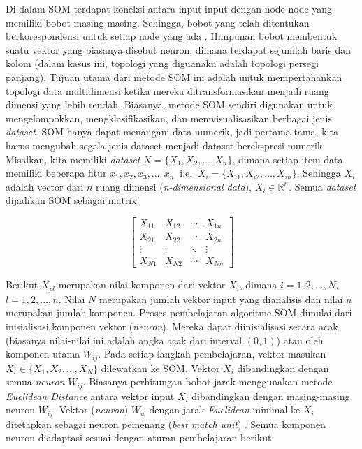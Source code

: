 Di dalam SOM terdapat koneksi antara input-input dengan node-node yang memiliki bobot masing-masing. Sehingga, bobot yang telah ditentukan berkorespondensi untuk setiap node yang ada \citep{StefanovicKurasova2014a}. Himpunan bobot membentuk suatu vektor yang biasanya disebut neuron, dimana terdapat sejumlah baris dan kolom (dalam kasus ini, topologi yang diguanakn adalah topologi persegi panjang). Tujuan utama dari metode SOM ini adalah untuk mempertahankan topologi data multidimensi ketika mereka ditransformasikan menjadi ruang dimensi yang lebih rendah. Biasanya, metode SOM sendiri digunakan untuk mengelompokkan, mengklasifikasikan, dan memvisualisasikan berbagai jenis \textit{dataset}. SOM hanya dapat menangani data numerik, jadi pertama-tama, kita harus mengubah segala jenis dataset menjadi dataset     berekspresi     numerik.     Misalkan,     kita     memiliki    \textit{dataset} $X = \{ X_1, X_2, \ldots, X_n \}$, dimana     setiap     item     data     memiliki     beberapa     fitur $x_1, x_2, x_3, \ldots, x_n \ $ i.e. $\ X_i = \{ X_{i1}, X_{i2}, \ldots, X_{in} \}$.
Sehingga $X_i$ adalah vector dari $n$ ruang dimensi (\textit{n-dimensional data}), $X_i \in \mathbb{R}^n$. Semua \textit{dataset} dijadikan SOM sebagai matrix:

\[
\begin{bmatrix}
	X_{11} & X_{12} & \cdots & X_{1n} \\
	X_{21} & X_{22} & \cdots & X_{2n} \\
	\vdots & \vdots & \ddots & \vdots \\
	X_{N1} & X_{N2} & \cdots & X_{Nn}
\end{bmatrix}
\]

Berikut $X_{pl}$ merupakan nilai komponen dari vektor $X_i$, dimana $i = 1, 2, \ldots, N$, $l = 1, 2, \ldots, n$. 
Nilai $N$ merupakan jumlah vektor input yang dianalisis dan nilai $n$ merupakan jumlah komponen. 
Proses pembelajaran algoritme SOM dimulai dari inisialisasi komponen vektor (\textit{neuron}). 
Mereka dapat diinisialisasi secara acak (biasanya nilai-nilai ini adalah angka acak dari interval $(0, 1)$) 
atau oleh komponen utama $W_{ij}$. 
Pada setiap langkah pembelajaran, vektor masukan $X_i \in \{ X_1, X_2, \ldots, X_N \}$ dilewatkan ke SOM. 
Vektor $X_i$ dibandingkan dengan semua \textit{neuron} $W_{ij}$. 
Biasanya perhitungan bobot jarak menggunakan metode \textit{Euclidean Distance} antara vektor input $X_i$ 
dibandingkan dengan masing-masing neuron $W_{ij}$. 
Vektor (\textit{neuron}) $W_w$ dengan jarak \textit{Euclidean} minimal ke $X_i$ ditetapkan sebagai neuron pemenang 
(\textit{best match unit}) \citep{StefanovicKurasova2014a}. 
Semua komponen neuron diadaptasi sesuai dengan aturan pembelajaran berikut:

